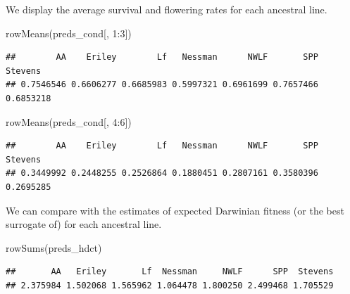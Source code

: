 \documentclass[
  ignorenonframetext,
]{beamer}
\newenvironment{Shaded}{\begin{snugshade}}{\end{snugshade}}
\newcommand{\DecValTok}[1]{\textcolor[rgb]{0.00,0.00,0.81}{#1}}
\newcommand{\FunctionTok}[1]{\textcolor[rgb]{0.00,0.00,0.00}{#1}}
\newcommand{\NormalTok}[1]{#1}
\newcommand{\SpecialCharTok}[1]{\textcolor[rgb]{0.00,0.00,0.00}{#1}}
\begin{document}
\begin{frame}[fragile]{}
\protect\hypertarget{section-40}{}
We display the average survival and flowering rates for each ancestral
line.

\vspace{12pt}
\tiny

\begin{Shaded}
\begin{Highlighting}[]
\FunctionTok{rowMeans}\NormalTok{(preds\_cond[, }\DecValTok{1}\SpecialCharTok{:}\DecValTok{3}\NormalTok{])}
\end{Highlighting}
\end{Shaded}

\begin{verbatim}
##        AA    Eriley        Lf   Nessman      NWLF       SPP   Stevens 
## 0.7546546 0.6606277 0.6685983 0.5997321 0.6961699 0.7657466 0.6853218
\end{verbatim}

\begin{Shaded}
\begin{Highlighting}[]
\FunctionTok{rowMeans}\NormalTok{(preds\_cond[, }\DecValTok{4}\SpecialCharTok{:}\DecValTok{6}\NormalTok{])}
\end{Highlighting}
\end{Shaded}

\begin{verbatim}
##        AA    Eriley        Lf   Nessman      NWLF       SPP   Stevens 
## 0.3449992 0.2448255 0.2526864 0.1880451 0.2807161 0.3580396 0.2695285
\end{verbatim}

\vspace{12pt}
\normalsize

We can compare with the estimates of expected Darwinian fitness (or the
best surrogate of) for each ancestral line.

\vspace{12pt}
\tiny

\begin{Shaded}
\begin{Highlighting}[]
\FunctionTok{rowSums}\NormalTok{(preds\_hdct)}
\end{Highlighting}
\end{Shaded}

\begin{verbatim}
##       AA   Eriley       Lf  Nessman     NWLF      SPP  Stevens 
## 2.375984 1.502068 1.565962 1.064478 1.800250 2.499468 1.705529
\end{verbatim}
\end{frame}
\end{document}
